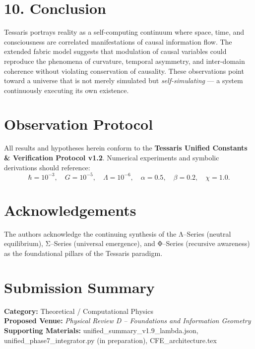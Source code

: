 \documentclass[11pt,a4paper]{article}
\begin{document}
\section{10. Conclusion}
Tessaris portrays reality as a self-computing continuum where space, time, and consciousness are correlated manifestations of causal information flow.  
The extended fabric model suggests that modulation of causal variables could reproduce the phenomena of curvature, temporal asymmetry, and inter-domain coherence without violating conservation of causality.  
These observations point toward a universe that is not merely simulated but \emph{self-simulating} --- a system continuously executing its own existence.

\section*{Observation Protocol}
All results and hypotheses herein conform to the \textbf{Tessaris Unified Constants \& Verification Protocol v1.2}.  
Numerical experiments and symbolic derivations should reference:
\[
\hbar = 10^{-3}, \quad G = 10^{-5}, \quad \Lambda = 10^{-6}, \quad \alpha = 0.5, \quad \beta = 0.2, \quad \chi = 1.0.
\]

\section*{Acknowledgements}
The authors acknowledge the continuing synthesis of the Λ–Series (neutral equilibrium), Σ–Series (universal emergence), and Φ–Series (recursive awareness) as the foundational pillars of the Tessaris paradigm.

\section*{Submission Summary}
\textbf{Category:} Theoretical / Computational Physics \\
\textbf{Proposed Venue:} \emph{Physical Review D – Foundations and Information Geometry} \\
\textbf{Supporting Materials:} unified\_summary\_v1.9\_lambda.json, unified\_phase7\_integrator.py (in preparation), CFE\_architecture.tex
\end{document}
